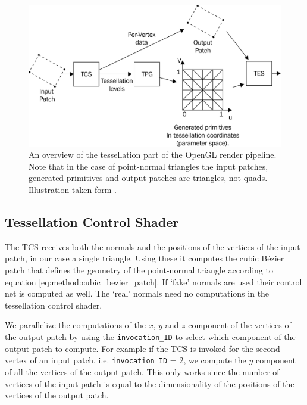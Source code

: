 	\begin{figure}
		\centering
		\includegraphics[width=\columnwidth]{content/img/implementation/tesselationPipeline.png}
		\caption{An overview of the tessellation part of the OpenGL render pipeline. Note that in the case of point-normal triangles the input patches, generated primitives and output patches are triangles, not quads. Illustration taken form \textcite{wolff2013opengl}.}
		\label{fig:implementation:tessellationPipeline}
	\end{figure}

\subsection{Tessellation Control Shader}
\label{ss:implementation:tcs}
	The TCS receives both the normals and the positions of the vertices of the input patch, in our case a single triangle. 
		Using these it computes the cubic Bézier patch that defines the geometry of the point-normal triangle according to equation \eqref{eq:method:cubic_bezier_patch}.
		If `fake' normals are used their control net is computed as well. 
		The `real' normals need no computations in the tessellation control shader.

		We parallelize the computations of the $x$, $y$ and $z$ component of the vertices of the output patch by using the \texttt{invocation\_ID} to select which component of the output patch to compute. For example if the TCS is invoked for the second vertex of an input patch, i.e. \texttt{invocation\_ID} = 2, we compute the $y$ component of all the vertices of the output patch. This only works since the number of vertices of the input patch is equal to the dimensionality of the positions of the vertices of the output patch.

